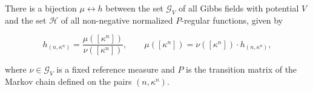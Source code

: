 There is a bijection $\mu \leftrightarrow h$ between the set $\mathcal{G}_V$ of all Gibbs fields with potential $V$ and the set $\mathcal{H}$ of all non-negative normalized $P$-regular functions, given by

$$
h_{(n, \kappa^n)} = \frac{\mu([\kappa^n])}{\nu([\kappa^n])},
\qquad
\mu([\kappa^n]) = \nu([\kappa^n]) \cdot h_{(n, \kappa^n)},
$$

where $\nu \in \mathcal{G}_V$ is a fixed reference measure and $P$ is the transition matrix of the Markov chain defined on the pairs $(n, \kappa^n)$.
